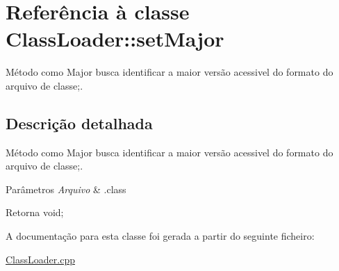 \hypertarget{class_class_loader_1_1set_major}{}\section{Referência à classe Class\+Loader\+:\+:set\+Major}
\label{class_class_loader_1_1set_major}


Método como Major busca identificar a maior versão acessivel do formato do arquivo de classe;.  




\subsection{Descrição detalhada}
Método como Major busca identificar a maior versão acessivel do formato do arquivo de classe;. 


\begin{DoxyParams}{Parâmetros}
{\em Arquivo} & .class \\
\hline
\end{DoxyParams}
\begin{DoxyReturn}{Retorna}
void; 
\end{DoxyReturn}


A documentação para esta classe foi gerada a partir do seguinte ficheiro\+:\begin{DoxyCompactItemize}
\item 
\hyperlink{_class_loader_8cpp}{Class\+Loader.\+cpp}\end{DoxyCompactItemize}
